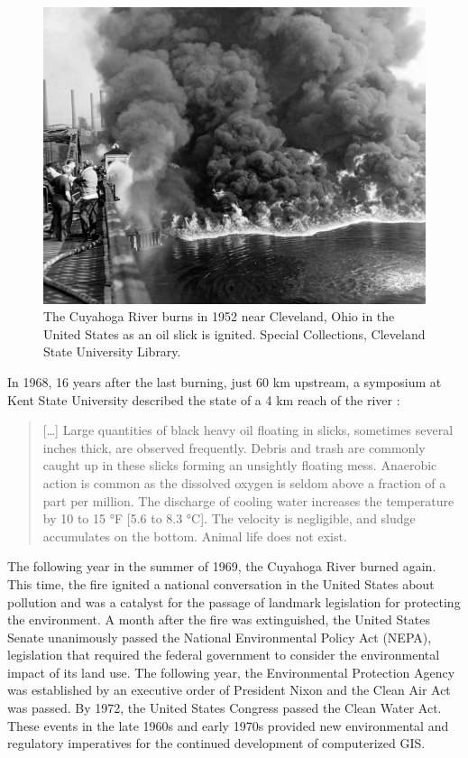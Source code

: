 \documentclass[
]{book}
\begin{document}
\begin{figure}
\includegraphics[width=0.75\linewidth]{images/01-Cuyahoga-River-fire-1952} \caption{The Cuyahoga River burns in 1952 near Cleveland, Ohio in the United States as an oil slick is ignited. Special Collections, Cleveland State University Library.}\label{fig:1-Cuyahoga-River-fire-1952}
\end{figure}

In 1968, 16 years after the last burning, just 60 km upstream, a symposium at Kent State University described the state of a 4 km reach of the river \citep{kent_state_university_cuyahoga_1968}:

\begin{quote}
{[}\ldots{]} Large quantities of black heavy oil floating in slicks, sometimes several inches thick, are observed frequently. Debris and trash are commonly caught up in these slicks forming an unsightly floating mess. Anaerobic action is common as the dissolved oxygen is seldom above a fraction of a part per million. The discharge of cooling water increases the temperature by 10 to 15 °F {[}5.6 to 8.3 °C{]}. The velocity is negligible, and sludge accumulates on the bottom. Animal life does not exist.
\end{quote}

The following year in the summer of 1969, the Cuyahoga River burned again. This time, the fire ignited a national conversation in the United States about pollution and was a catalyst for the passage of landmark legislation for protecting the environment. A month after the fire was extinguished, the United States Senate unanimously passed the National Environmental Policy Act (NEPA), legislation that required the federal government to consider the environmental impact of its land use. The following year, the Environmental Protection Agency was established by an executive order of President Nixon and the Clean Air Act was passed. By 1972, the United States Congress passed the Clean Water Act. These events in the late 1960s and early 1970s provided new environmental and regulatory imperatives for the continued development of computerized GIS.
\end{document}
